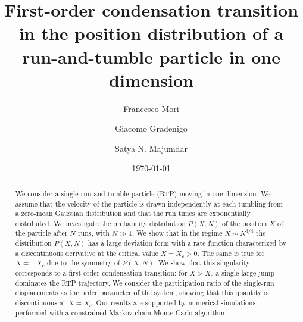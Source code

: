 \documentclass[aps,pre,twocolumn,superscriptaddress,showpacs]{revtex4-1}
\begin{document}
\title{First-order condensation transition in the position distribution of a run-and-tumble particle in one dimension}

\author{Francesco Mori}

\author{Giacomo Gradenigo}

\author{Satya N. Majumdar}
\date{\today}
\begin{abstract}
  We consider a single run-and-tumble particle (RTP) moving in one
  dimension. We assume that the velocity of the particle is drawn
  independently at each tumbling from a zero-mean Gaussian
  distribution and that the run times are exponentially distributed. We investigate the probability distribution $P(X,N)$
  of the position $X$ of the particle after $N$ runs, with $N\gg 1$.
  We show that in the regime $ X \sim N^{3/4}$ the
  distribution $P(X,N)$ has a large deviation form with a rate
  function characterized by a discontinuous derivative at the critical
  value $X=X_c>0$. The same is true for $X=-X_c$ due to the symmetry
  of $P(X,N)$. We show that this singularity corresponds to a
    first-order condensation transition: for $X>X_c$ a single large
    jump dominates the RTP trajectory. We consider the participation
    ratio of the single-run displacements as the order parameter of the
    system, showing that this quantity is discontinuous at
    $X=X_c$. Our results are supported by numerical simulations
    performed with a constrained Markov chain Monte Carlo algorithm.
\end{abstract}

\maketitle

\end{document}
